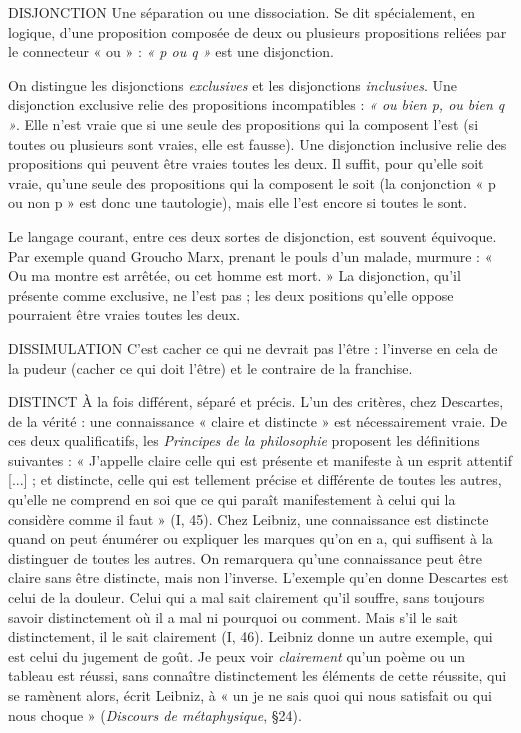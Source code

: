 DISJONCTION Une séparation ou une dissociation. Se dit spécialement, en
logique, d’une proposition composée de deux ou plusieurs
propositions reliées par le connecteur « ou » : {\it « p ou q »} est une disjonction.

On distingue les disjonctions {\it exclusives} et les disjonctions {\it inclusives}. Une
disjonction exclusive relie des propositions incompatibles : {\it « ou bien p, ou bien
q »}. Elle n’est vraie que si une seule des propositions qui la composent l’est (si
toutes ou plusieurs sont vraies, elle est fausse). Une disjonction inclusive relie
des propositions qui peuvent être vraies toutes les deux. Il suffit, pour qu’elle
soit vraie, qu’une seule des propositions qui la composent le soit (la conjonction
« p ou non p » est donc une tautologie), mais elle l’est encore si toutes le
sont.

Le langage courant, entre ces deux sortes de disjonction, est souvent équivoque.
Par exemple quand Groucho Marx, prenant le pouls d’un malade,
murmure : « Ou ma montre est arrêtée, ou cet homme est mort. » La disjonction,
qu'il présente comme exclusive, ne l’est pas ; les deux positions qu’elle
oppose pourraient être vraies toutes les deux.

DISSIMULATION C’est cacher ce qui ne devrait pas l’être : l'inverse en
cela de la pudeur (cacher ce qui doit l’être) et le
contraire de la franchise.

DISTINCT À la fois différent, séparé et précis. L’un des critères, chez Descartes,
de la vérité : une connaissance « claire et distincte » est
nécessairement vraie. De ces deux qualificatifs, les {\it Principes de la philosophie}
proposent les définitions suivantes : « J’appelle claire celle qui est présente et
manifeste à un esprit attentif [...] ; et distincte, celle qui est tellement précise et
différente de toutes les autres, qu’elle ne comprend en soi que ce qui paraît manifestement
à celui qui la considère comme il faut » (I, 45). Chez Leibniz, une
connaissance est distincte quand on peut énumérer ou expliquer les marques
qu'on en a, qui suffisent à la distinguer de toutes les autres. On remarquera
qu’une connaissance peut être claire sans être distincte, mais non l'inverse.
L'exemple qu’en donne Descartes est celui de la douleur. Celui qui a mal sait clairement
qu'il souffre, sans toujours savoir distinctement où il a mal ni pourquoi
ou comment. Mais s’il le sait distinctement, il le sait clairement (I, 46). Leibniz
donne un autre exemple, qui est celui du jugement de goût. Je peux voir {\it clairement}
qu'un poème ou un tableau est réussi, sans connaître distinctement les éléments
de cette réussite, qui se ramènent alors, écrit Leibniz, à « un je ne sais quoi
qui nous satisfait ou qui nous choque » ({\it Discours de métaphysique}, \S 24).

